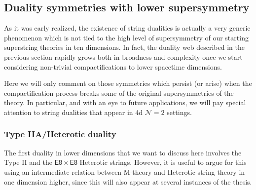 \subsection{Duality symmetries with lower supersymmetry}\label{ss:dualitieswithlowersusy}

As it was early realized, the existence of string dualities is actually a very generic phenomenon which is not tied to the high level of supersymmetry of our starting superstring theories in ten dimensions. In fact, the duality web described in the previous section rapidly grows both in broadness and complexity once we start considering non-trivial compactifications to lower spacetime dimensions. 

Here we will only comment on those symmetries which persist (or arise) when the compactification process breaks some of the original supersymmetries of the theory. In particular, and with an eye to future applications, we will pay special attention to string dualities that appear in 4d $\mathcal{N}=2$ settings.
 
\subsubsection*{Type IIA/Heterotic duality}

The first duality in lower dimensions that we want to discuss here involves the Type II and the $\mathsf{E8}\times \mathsf{E8}$ Heterotic strings. However, it is useful to argue for this using an intermediate relation between M-theory and Heterotic string theory in one dimension higher, since this will also appear at several instances of the thesis. 

